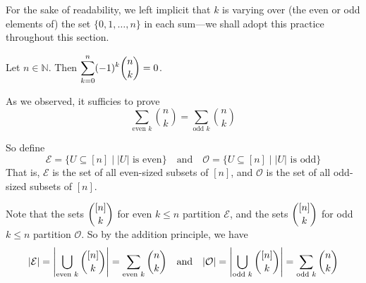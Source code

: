 For the sake of readability, we left implicit that $k$ is varying over (the even or odd elements of) the set $\{ 0, 1, \dots, n \}$ in each sum---we shall adopt this practice throughout this section.

\begin{proposition}
\label{propAlternatingSumOfBinomialCoefficientsByBijection}
Let $n \in \mathbb{N}$. Then $\displaystyle \sum_{k=0}^n (-1)^k \dbinom{n}{k} = 0$.
\end{proposition}

\begin{cproof}
As we observed, it sufficies to prove
\[ \sum_{\text{even } k} \binom{n}{k} = \sum_{\text{odd } k} \binom{n}{k} \]

So define
\[ \mathcal{E} = \{ U \subseteq [n] \mid |U| \text{ is even} \} \quad \text{and} \quad \mathcal{O} = \{ U \subseteq [n] \mid |U| \text{ is odd} \} \]
That is, $\mathcal{E}$ is the set of all even-sized subsets of $[n]$, and $\mathcal{O}$ is the set of all odd-sized subsets of $[n]$.

Note that the sets $\dbinom{[n]}{k}$ for even $k \le n$ partition $\mathcal{E}$, and the sets $\dbinom{[n]}{k}$ for odd $k \le n$ partition $\mathcal{O}$. So by the addition principle, we have
\[ |\mathcal{E}| = \left| \bigcup_{\text{even } k} \dbinom{[n]}{k} \right| = \sum_{\text{even } k} \dbinom{n}{k} \quad \text{and} \quad |\mathcal{O}| = \left| \bigcup_{\text{odd } k} \dbinom{[n]}{k} \right| = \sum_{\text{odd } k} \dbinom{n}{k} \]


\end{cproof}
